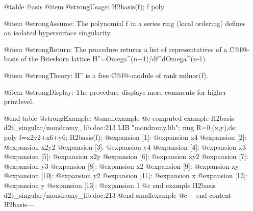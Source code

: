 @table @asis
@item @strong{Usage:}
H2basis(f); f poly

@item @strong{Assume:}
The polynomial f in a series ring (local ordering) defines
an isolated hypersurface singularity.

@item @strong{Return:}
The procedure returns a list of representatives of a C@{f@}-basis of the
Brieskorn lattice H''=Omega^(n+1)/df^dOmega^(n-1).

@item @strong{Theory:}
H'' is a free C@{f@}-module of rank milnor(f).

@item @strong{Display:}
The procedure displays more comments for higher printlevel.

@end table
@strong{Example:}
@smallexample
@c computed example H2basis d2t_singular/mondromy_lib.doc:213 
LIB "mondromy.lib";
ring R=0,(x,y),ds;
poly f=x2y2+x6+y6;
H2basis(f);
@expansion{} [1]:
@expansion{}    x4
@expansion{} [2]:
@expansion{}    x2y2
@expansion{} [3]:
@expansion{}    y4
@expansion{} [4]:
@expansion{}    x3
@expansion{} [5]:
@expansion{}    x2y
@expansion{} [6]:
@expansion{}    xy2
@expansion{} [7]:
@expansion{}    y3
@expansion{} [8]:
@expansion{}    x2
@expansion{} [9]:
@expansion{}    xy
@expansion{} [10]:
@expansion{}    y2
@expansion{} [11]:
@expansion{}    x
@expansion{} [12]:
@expansion{}    y
@expansion{} [13]:
@expansion{}    1
@c end example H2basis d2t_singular/mondromy_lib.doc:213
@end smallexample
@c ---end content H2basis---
